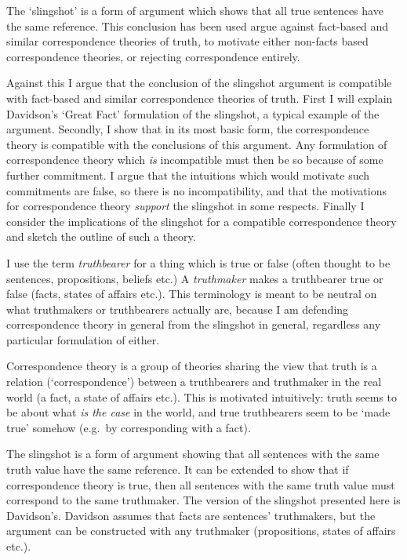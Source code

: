 The `slingshot' is a form of argument which shows that all true sentences have the same reference.
This conclusion has been used argue against fact-based and similar correspondence theories of truth, to motivate either non-facts based correspondence theories, or rejecting correspondence entirely.

Against this I argue that the conclusion of the slingshot argument is compatible with fact-based and similar correspondence theories of truth.
First I will explain Davidson's `Great Fact' formulation of the slingshot, a typical example of the argument.
Secondly, I show that in its most basic form, the correspondence theory is compatible with the conclusions of this argument.
Any formulation of correspondence theory which \emph{is} incompatible must then be so because of some further commitment.
I argue that the intuitions which would motivate such commitments are false, so there is no incompatibility, and that the motivations for correspondence theory \emph{support} the slingshot in some respects.
Finally I consider the implications of the slingshot for a compatible correspondence theory and sketch the outline of such a theory.

I use the term \textit{truthbearer} for a thing which is true or false (often thought to be sentences, propositions, beliefs etc.)
A \textit{truthmaker} makes a truthbearer true or false (facts, states of affairs etc.).
This terminology is meant to be neutral on what truthmakers or truthbearers actually are, because I am defending correspondence theory in general from the slingshot in general, regardless any particular formulation of either.

Correspondence theory is a group of theories sharing the view that truth is a relation (`correspondence') between a truthbearers and truthmaker in the real world (a fact, a state of affairs etc.).
This is motivated intuitively: truth seems to be about what \emph{is the case} in the world, and true truthbearers seem to be `made true' somehow (e.g.\ by corresponding with a fact).

The slingshot is a form of argument showing that all sentences with the same truth value have the same reference.
It can be extended to show that if correspondence theory is true, then all sentences with the same truth value must correspond to the same truthmaker.
The version of the slingshot presented here is Davidson's.
\parencite[753]{Davidson_1969}
Davidson assumes that facts are sentences' truthmakers, but the argument can be constructed with any truthmaker (propositions, states of affairs etc.).
\parencite*[752]{Davidson_1969}


